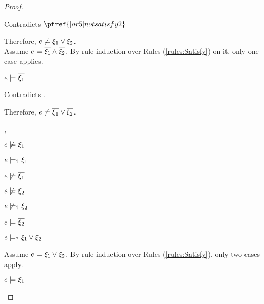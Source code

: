 \begin{proof}
\begin{byCases}
\begin{byCases}
\begin{byCases}
            Contradicts $\pfref{[or5]notsatisfy2}$
        \end{byCases}
        Therefore, $e \not\models \xi_1 \vee \xi_2$.\\
        Assume $e \models \overline{\xi_1} \wedge \overline{\xi_2}$. By rule induction over Rules (\ref{rules:Satisfy}) on it, only one case applies.
        \begin{byCases}
        \item[\text{(\ref{rule:CSAnd})}]
            \begin{pfsteps*}
            \item $e \models \overline{\xi_1}$ 
            \end{pfsteps*}
            Contradicts .
        \end{byCases}
        Therefore, $e \not\models \overline{\xi_1} \vee \overline{\xi_2}$.
    \item[\cmaysatisfy{e}{\xi_1},\csatisfy{e}{\cdual{\xi_2}}]
        \begin{pfsteps*}
        \item $e \not\models \xi_1$  
        \item $e \models_{?} \xi_1$  
        \item $e \not\models \overline{\xi_1}$  
        \item $e \not\models \xi_2$  
        \item $e \not\models_{?} \xi_2$  
        \item $e \models \overline{\xi_2}$  
        \item $e \models_{?} \xi_1 \vee \xi_2$  
        \end{pfsteps*}
        Assume $e \models \xi_1 \vee \xi_2$. By rule induction over Rules (\ref{rules:Satisfy}), only two cases apply.
        \begin{byCases}
        \item[\text{(\ref{rule:CSOr1})}]
            \begin{pfsteps*}
            \item $e \models \xi_1$ 

\end{pfsteps*}
\end{byCases}
\end{byCases}
\end{byCases}
\end{proof}
